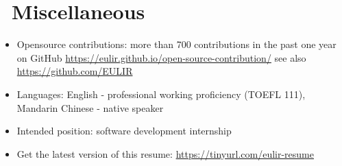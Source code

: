\documentclass{resume}
\begin{document}

\section{\faInfo\ Miscellaneous}
\begin{itemize}[parsep=0.5ex]
  \item Opensource contributions: more than 700 contributions in the past one year on GitHub \url{https://eulir.github.io/open-source-contribution/} 
    see also {\url{https://github.com/EULIR}}
  \item Languages: English - professional working proficiency (TOEFL 111), Mandarin Chinese - native speaker
  \item Intended position: software development internship
  \item Get the latest version of this resume: \url{https://tinyurl.com/eulir-resume}
\end{itemize}
\end{document}
